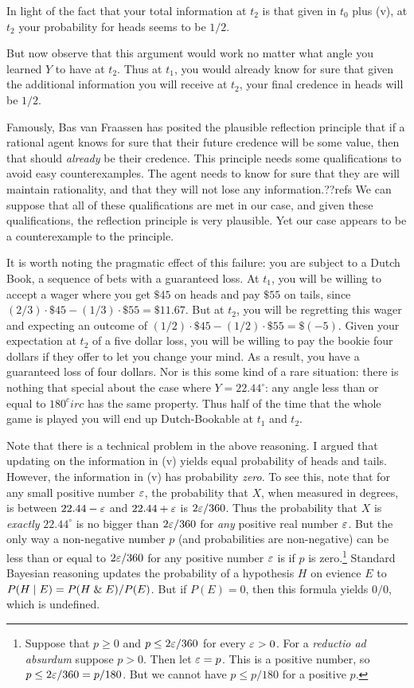 In light of the fact that your total information at $t_2$ is that given in $t_0$ plus (v), at $t_2$ your
probability for heads seems to be $1/2$. 

But now observe that this argument would work no matter what angle you learned $Y$ to have at $t_2$. Thus at $t_1$, you would
already know for sure that given the additional information you will receive at $t_2$, your final credence in heads will be
$1/2$. 

Famously, Bas van Fraassen has posited the plausible reflection principle that if a rational agent knows for sure that their future credence
will be some value, then that should \textit{already} be their credence. This principle needs some qualifications to avoid
easy counterexamples. The agent needs to know for sure that they are will maintain rationality, and that they will 
not lose any information.??refs We can suppose that all of these qualifications are met in our case, and given these qualifications,
the reflection principle is very plausible. Yet our case appears to be a counterexample to the principle.

It is worth noting the pragmatic effect of this failure: you are subject to a Dutch Book, a sequence of bets with a guaranteed
loss. At $t_1$, you will be willing to accept a wager where you get $\$45$ on heads and pay $\$55$ on tails, since
$(2/3)\cdot \$45 - (1/3)\cdot \$55 = \$11.67$. But at $t_2$, you will be regretting this wager and expecting an outcome of
$(1/2)\cdot \$45 - (1/2)\cdot \$55 = \$(-5)$. Given your expectation at $t_2$ of a five dollar loss, you will be willing to pay the 
bookie four dollars if they offer to let you change your mind. As a result, you have a guaranteed loss of four dollars.  
Nor is this some kind of a rare situation: there is nothing that special about the case where $Y=22.44^\circ$: any angle
less than or equal to $180^circ$ has the same property. Thus half of the time that the whole game is played you will end up
Dutch-Bookable at $t_1$ and $t_2$.

Note that there is a technical problem in the above reasoning. I argued that updating on the information in (v) yields equal probability
of heads and tails. However, the information in (v) has probability \textit{zero}. To see this, note that for any small positive
number $\varepsilon$, the probability that $X$, when measured in degrees, is between $22.44-\varepsilon$ and $22.44+\varepsilon$ is $2\varepsilon / 360$. Thus the 
probability that $X$ is \textit{exactly} $22.44^\circ$ is no bigger than $2\varepsilon / 360$ for \textit{any} positive real number $\varepsilon$.
But the only way a non-negative number $p$ (and probabilities are non-negative) can be less than or equal to $2\varepsilon / 360$ for any positive
number $\varepsilon$ is if $p$ is zero.\footnote{Suppose that $p\ge 0$ and $p\le 2\varepsilon/360$ for 
every $\varepsilon>0$. For a \textit{reductio ad absurdum} suppose $p>0$. Then let $\varepsilon = p$. This is a positive number, so $p \le 2\varepsilon/360 = p/180$.
But we cannot have $p \le p/180$ for a positive $p$.} Standard Bayesian reasoning updates the probability of a hypothesis $H$ on evience $E$
to $P(H\mid E)=P(H\mathrel{\&} E)/P(E)$. But if $P(E)=0$, then this formula yields $0/0$, which is undefined. 

